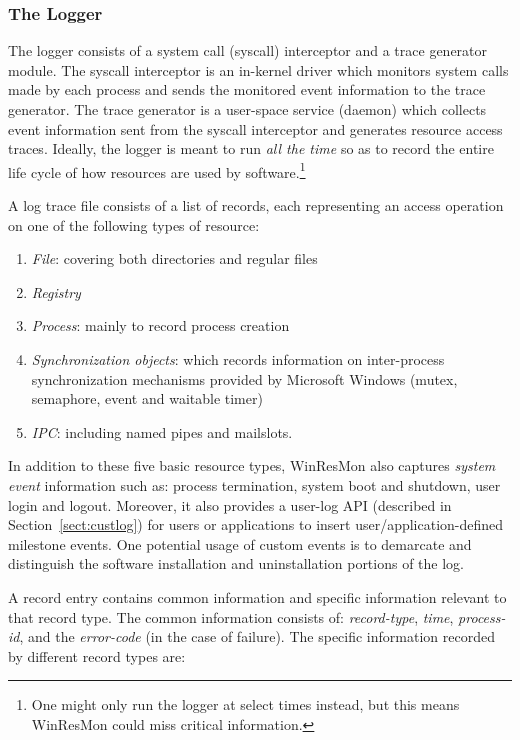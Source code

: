 \subsubsection{The Logger}

The logger consists of a system call (syscall) interceptor and a trace
generator module.  The syscall interceptor is an in-kernel driver which
monitors system calls made by each process and sends the monitored event
information to the trace generator.  The trace generator is a user-space
service (daemon) which collects event information sent from the syscall
interceptor and generates resource access traces.  Ideally, the logger is
meant to run {\em all the time} so as to record the entire life cycle of how
resources are used by software.\footnote{ One might only run the
logger at select times instead, but this means WinResMon could miss critical information. }

A log trace file consists of a list of records, each representing 
an access operation on one of the following types of resource:

\begin{enumerate}
\item {\em File}: covering both directories and regular files
\item {\em Registry}
\item {\em Process}: mainly to record process creation
\item {\em Synchronization objects}: which records information on
inter-process synchronization mechanisms provided by Microsoft Windows (mutex,
semaphore, event and waitable timer)
\item {\em IPC}: including named pipes and mailslots.
\end{enumerate}

In addition to these five basic resource types, WinResMon also captures {\it
system event} information such as: process termination, system boot and
shutdown, user login and logout.  
Moreover, it also provides a user-log API
(described in Section~\ref{sect:custlog}) for users or applications to insert
user/application-defined milestone events.  One potential usage of custom
events is to demarcate and distinguish the software installation and
uninstallation portions of the log.

A record entry contains common information and specific information
relevant to that record type.
The common information consists of: {\em record-type}, 
{\em time}, {\em process-id}, and the {\em error-code} 
(in the case of failure).  
The specific information recorded by different record types are:

